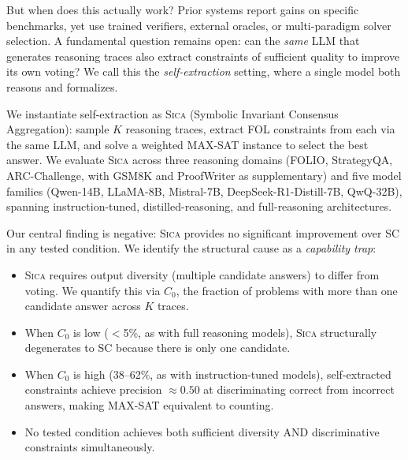 \documentclass[11pt,a4paper]{article}
\newcommand{\sica}{\textsc{Sica}}
\begin{document}
But when does this actually work?
Prior systems report gains on specific benchmarks, yet use trained verifiers, external oracles, or multi-paradigm solver selection.
A fundamental question remains open: can the \emph{same} LLM that generates reasoning traces also extract constraints of sufficient quality to improve its own voting?
We call this the \emph{self-extraction} setting, where a single model both reasons and formalizes.

We instantiate self-extraction as \sica{} (Symbolic Invariant Consensus Aggregation): sample $K$ reasoning traces, extract FOL constraints from each via the same LLM, and solve a weighted MAX-SAT instance to select the best answer.
We evaluate \sica{} across three reasoning domains (FOLIO, StrategyQA, ARC-Challenge, with GSM8K and ProofWriter as supplementary) and five model families (Qwen-14B, LLaMA-8B, Mistral-7B, DeepSeek-R1-Distill-7B, QwQ-32B), spanning instruction-tuned, distilled-reasoning, and full-reasoning architectures.

Our central finding is negative: \sica{} provides no significant improvement over SC in any tested condition.
We identify the structural cause as a \emph{capability trap}:
\begin{itemize}
    \item \sica{} requires output diversity (multiple candidate answers) to differ from voting. We quantify this via $C_0$, the fraction of problems with more than one candidate answer across $K$ traces.
    \item When $C_0$ is low ($<$5\%, as with full reasoning models), \sica{} structurally degenerates to SC because there is only one candidate.
    \item When $C_0$ is high (38--62\%, as with instruction-tuned models), self-extracted constraints achieve precision $\approx 0.50$ at discriminating correct from incorrect answers, making MAX-SAT equivalent to counting.
    \item No tested condition achieves both sufficient diversity AND discriminative constraints simultaneously.
\end{itemize}
\end{document}
